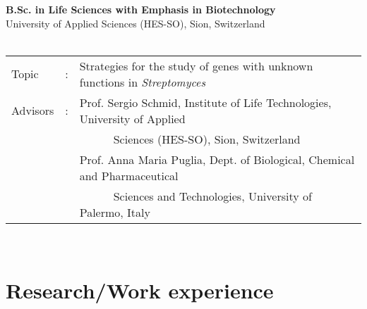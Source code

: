 \documentclass{CV}
\begin{document}

\vspace{-0.5em}
\textbf{B.Sc. in Life Sciences with Emphasis in Biotechnology} \hfill {}\\
University of Applied Sciences (HES-SO), Sion, Switzerland\\
~\\
\begin{tabular}{lcl}
    Topic&:& Strategies for the study of genes with unknown functions in \textit{Streptomyces}\\
    Advisors&:& Prof. Sergio Schmid, Institute of Life Technologies, University of Applied \\
    &&~~~~~~Sciences (HES-SO), Sion, Switzerland\\
    && Prof. Anna Maria Puglia, Dept. of Biological, Chemical and Pharmaceutical\\
    && ~~~~~~Sciences and Technologies, University of Palermo, Italy\\
\end{tabular}
~\\




\newpage
\section*{Research/Work experience}
\end{document}
